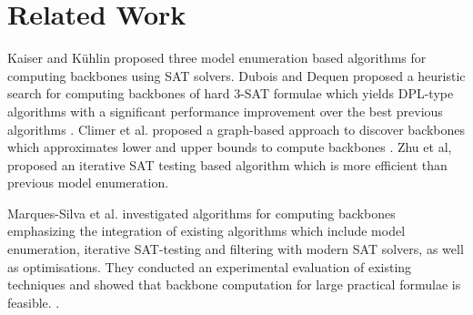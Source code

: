 \section{Related Work}\label{sec:relw}

Kaiser and K\"{u}hlin proposed three model enumeration based algorithms for computing backbones \cite{KKW2001} using SAT solvers.
%
Dubois and Dequen proposed a heuristic search for computing backbones of hard 3-SAT formulae which yields DPL-type algorithms with a significant
performance improvement over the best previous algorithms \cite{DD2001}.
Climer et al. proposed a graph-based approach to discover backbones which approximates lower and upper bounds to compute
backbones \cite{CZ2002}.%
%
%
Zhu et al, proposed an iterative SAT testing based algorithm \cite{ZWSM11,ZWM11} which is more efficient than previous model enumeration.

Marques-Silva et al.  investigated algorithms for computing backbones emphasizing the integration of existing algorithms which include model enumeration, iterative SAT-testing and filtering with modern SAT solvers, as well as optimisations.
They conducted an experimental evaluation of existing techniques and showed that backbone computation for large practical formulae is feasible. \cite{MJML2010,JLMS12,JLM15}.





